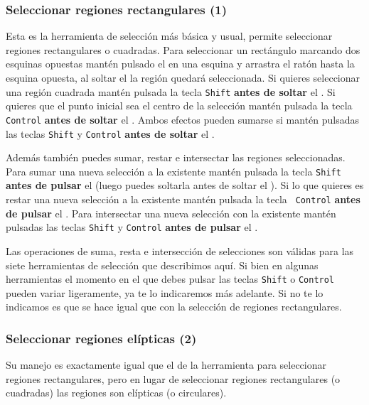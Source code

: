 \subsubsection{Seleccionar regiones rectangulares (1)}

Esta  es la  herramienta  de  selección más  básica  y usual,  permite
seleccionar regiones  rectangulares o  cuadradas. Para  seleccionar un
rectángulo marcando  dos esquinas opuestas  mantén pulsado el  \bir en
una esquina y arrastra el ratón hasta la esquina opuesta, al soltar el
\bir la región quedará seleccionada. Si quieres seleccionar una región
cuadrada mantén pulsada la tecla {\tt  Shift} {\bf antes de soltar} el
\bir. Si  quieres que el punto  inicial sea el centro  de la selección
mantén pulsada la  tecla {\tt Control} {\bf antes de  soltar} el \bir.
Ambos efectos pueden sumarse si mantén pulsadas las teclas {\tt Shift}
y {\tt Control} {\bf antes de soltar} el \bir.

Además  también  puedes  sumar,  restar  e  intersectar  las  regiones
seleccionadas. Para  sumar una nueva  selección a la  existente mantén
pulsada la  tecla {\tt  Shift} {\bf  antes de  pulsar} el  \bir (luego
puedes soltarla antes de soltar el  \bir). Si lo que quieres es restar
una  nueva selección  a  la  existente mantén  pulsada  la tecla  {\tt
Control} {\bf  antes de  pulsar} el \bir.  Para intersectar  una nueva
selección con  la existente mantén  pulsadas las teclas {\tt  Shift} y
{\tt Control} {\bf antes de pulsar} el \bir.

Las  operaciones de  suma,  resta e  intersección  de selecciones  son
válidas para las siete herramientas de selección que describimos aquí.
Si bien en algunas herramientas el  momento en el que debes pulsar las
teclas {\tt Shift} o {\tt Control} pueden variar ligeramente, ya te lo
indicaremos más adelante.  Si no te lo indicamos es  que se hace igual
que con la selección de regiones rectangulares.

\subsubsection{Seleccionar regiones elípticas (2)}

Su  manejo  es  exactamente  igual  que  el  de  la  herramienta  para
seleccionar  regiones  rectangulares,  pero en  lugar  de  seleccionar
regiones  rectangulares (o  cuadradas) las  regiones son  elípticas (o
circulares).

